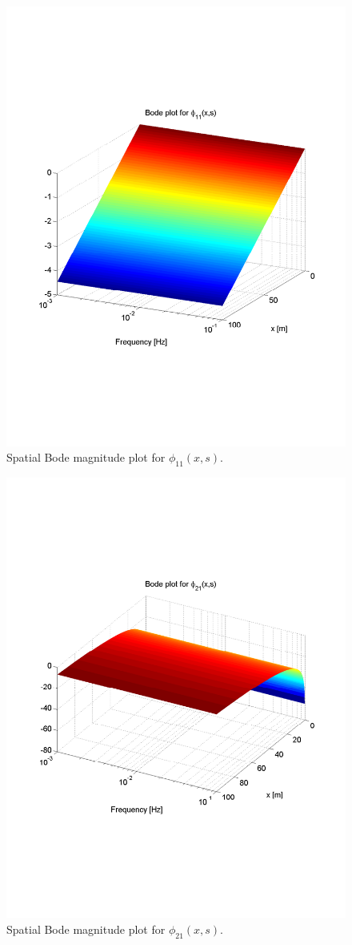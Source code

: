 \documentclass[preprint]{elsarticle}
\begin{document}
\begin{figure}[H]
\centering
\includegraphics[trim = 0mm 60mm 0mm 60mm, width = 120mm]{diagdistr11freeflow}
\caption{Spatial Bode magnitude plot for $\phi_{11}(x,s)$.}
\end{figure}
\clearpage
\begin{figure}[H]
\centering
\includegraphics[trim = 0mm 60mm 0mm 60mm, width = 120mm]{diagdistr21freeflow}
\caption{Spatial Bode magnitude plot for $\phi_{21}(x,s)$.}
\end{figure}
\end{document}
